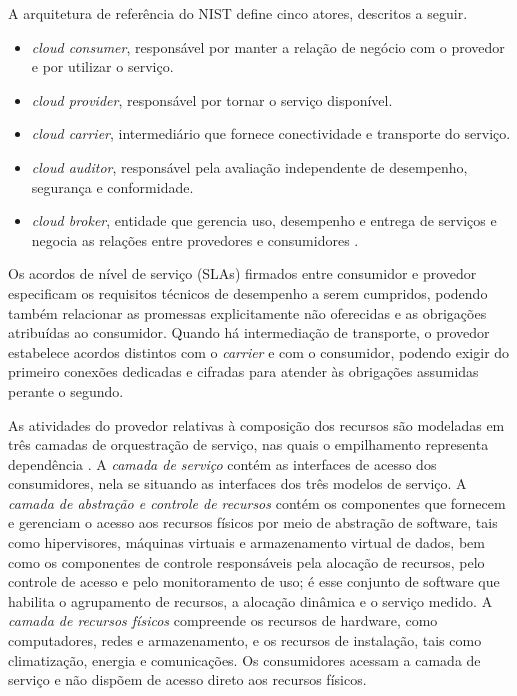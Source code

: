 A arquitetura de referência do NIST define cinco atores, descritos a seguir. 

\begin{itemize}
  \item \emph{cloud consumer}, responsável por manter a relação de negócio com o provedor e por utilizar o serviço.
  \item \emph{cloud provider}, responsável por tornar o serviço disponível.
  \item \emph{cloud carrier}, intermediário que fornece conectividade e transporte do serviço.
  \item \emph{cloud auditor}, responsável pela avaliação independente de desempenho, segurança e conformidade.
  \item \emph{cloud broker}, entidade que gerencia uso, desempenho e entrega de serviços e negocia as relações entre provedores e consumidores \cite{liu2011nist}.
\end{itemize}

Os acordos de nível de serviço (SLAs) firmados entre consumidor e provedor especificam os requisitos técnicos de desempenho a serem cumpridos, podendo também relacionar as promessas explicitamente não oferecidas e as obrigações atribuídas ao consumidor. Quando há intermediação de transporte, o provedor estabelece acordos distintos com o \emph{carrier} e com o consumidor, podendo exigir do primeiro conexões dedicadas e cifradas para atender às obrigações assumidas perante o segundo.

As atividades do provedor relativas à composição dos recursos são modeladas em três camadas de orquestração de serviço, nas quais o empilhamento representa dependência \cite{liu2011nist}. A \emph{camada de serviço} contém as interfaces de acesso dos consumidores, nela se situando as interfaces dos três modelos de serviço. A \emph{camada de abstração e controle de recursos} contém os componentes que fornecem e gerenciam o acesso aos recursos físicos por meio de abstração de software, tais como hipervisores, máquinas virtuais e armazenamento virtual de dados, bem como os componentes de controle responsáveis pela alocação de recursos, pelo controle de acesso e pelo monitoramento de uso; é esse conjunto de software que habilita o agrupamento de recursos, a alocação dinâmica e o serviço medido. A \emph{camada de recursos físicos} compreende os recursos de hardware, como computadores, redes e armazenamento, e os recursos de instalação, tais como climatização, energia e comunicações. Os consumidores acessam a camada de serviço e não dispõem de acesso direto aos recursos físicos.

